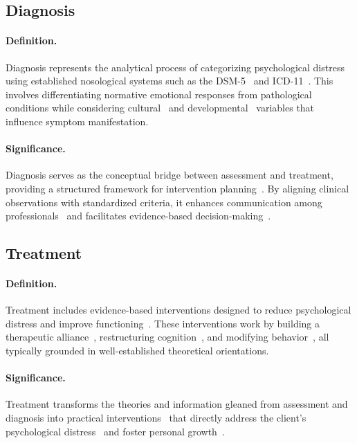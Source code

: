 \subsection{Diagnosis} 

\paragraph{Definition.} Diagnosis represents the analytical process of categorizing psychological distress using established nosological systems such as the DSM-5~\cite{Section2:11} and ICD-11~\cite{ICD11}. This involves differentiating normative emotional responses from pathological conditions while considering cultural~\cite{AlanCu2010} and developmental~\cite{kawade2012} variables that influence symptom manifestation.

\paragraph{Significance.} Diagnosis serves as the conceptual bridge between assessment and treatment, providing a structured framework for intervention planning~\cite{jensen2011understanding}. By aligning clinical observations with standardized criteria, it enhances communication among professionals~\cite{craddock2014psychiatric} and facilitates evidence-based decision-making~\cite{apa2006evidence}. 

\subsection{Treatment}

\paragraph{Definition.} Treatment includes evidence-based interventions designed to reduce psychological distress and improve functioning~\cite{apa2006evidence}. These interventions work by building a therapeutic alliance~\cite{elvins2008conceptualization}, restructuring cognition~\cite{ezawa2023cognitive}, and modifying behavior~\cite{martin2019behavior}, all typically grounded in well-established theoretical orientations.

\paragraph{Significance.} Treatment transforms the theories and information gleaned from assessment and diagnosis into practical interventions~\cite{prochaska2018systems} that directly address the client's psychological distress~\cite{barlow2021clinical} and foster personal growth~\cite{lambert2013bergin}. 

